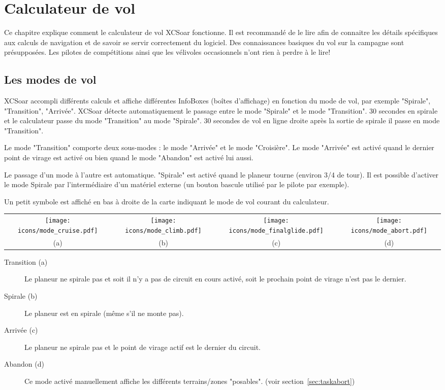\chapter{Calculateur de vol}\label{cha:glide}
Ce chapitre explique comment le calculateur de vol XCSoar fonctionne. Il est recommandé de le lire afin de connaitre les détails spécifiques aux calculs de navigation et de savoir se servir correctement du logiciel. Des connaissances basiques du vol sur la campagne sont présupposées. Les pilotes de compétitions ainsi que les vélivoles occasionnels n'ont rien à perdre à le lire!

\section{Les modes de vol}
XCSoar accompli différents calculs et affiche différentes InfoBoxes (boîtes d'affichage) en fonction du mode de vol, par exemple "Spirale", "Transition", "Arrivée". XCSoar détecte automatiquement le passage entre le mode "Spirale" et le mode "Transition". 30 secondes en spirale et le calculateur passe du mode "Transition" au mode "Spirale". 30 secondes de vol en ligne droite après la sortie de spirale il passe en mode "Transition".

Le mode "Transition" comporte deux sous-modes : le mode "Arrivée" et le mode "Croisière". Le mode "Arrivée" est activé quand le dernier point de virage est activé ou bien quand le mode "Abandon" est activé lui aussi.

Le passage d'un mode à l'autre est automatique. "Spirale" est activé quand le planeur tourne (environ 3/4 de tour). Il est possible d'activer le mode Spirale par l'intermédiaire d'un matériel externe (un bouton bascule utilisé par le pilote par exemple).

Un petit symbole est affiché en bas à droite de la carte indiquant le mode de vol courant du calculateur.

\begin{tabular}{c c c c}%
\texttt{[image: icons/mode\_cruise.pdf]} &
\texttt{[image: icons/mode\_climb.pdf]} &
\texttt{[image: icons/mode\_finalglide.pdf]} &
\texttt{[image: icons/mode\_abort.pdf]}\\
(a) & (b) & (c) & (d)
\end{tabular}

\begin{description}
\item[Transition (a)]   Le planeur ne spirale pas et soit il n'y a pas de circuit en cours activé, soit le prochain point de virage n'est pas le dernier.
\item[Spirale (b)]  Le planeur est en spirale (même s'il ne monte pas).
\item[Arrivée (c)]  Le planeur ne spirale pas et le point de virage actif est le dernier du circuit.
\item[Abandon (d)]  Ce mode activé manuellement affiche les différents terrains/zones "posables". (voir section~\ref{sec:taskabort})
\end{description}

